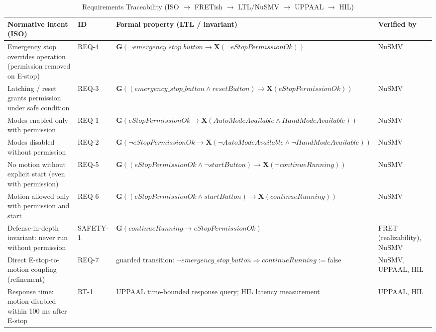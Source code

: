 \documentclass{ieeeaccess}
\theoremstyle{definition}
\newcommand{\G}{\mathbf{G}}
\newcommand{\X}{\mathbf{X}}
\begin{document}
\begin{table}[t]
\centering
\caption{Requirements Traceability (ISO $\rightarrow$ FRETish $\rightarrow$ LTL/NuSMV $\rightarrow$ UPPAAL $\rightarrow$ HIL)}
\label{tab:traceabilityMatrix}
\small
\setlength{\tabcolsep}{4pt}
\begin{tabular}{P{0.28\textwidth} P{0.08\textwidth} P{0.42\textwidth} P{0.12\textwidth}}
\toprule
\textbf{Normative intent (ISO)} & \textbf{ID} & \textbf{Formal property (LTL / invariant)} & \textbf{Verified by} \\
\midrule
Emergency stop overrides operation (permission removed on E-stop) & REQ-4 & $\G(\neg \mathit{emergency\_stop\_button} \rightarrow \X(\neg \mathit{eStopPermissionOk}))$ & NuSMV \\
Latching / reset grants permission under safe condition & REQ-3 & $\G((\mathit{emergency\_stop\_button} \land \mathit{resetButton}) \rightarrow \X(\mathit{eStopPermissionOk}))$ & NuSMV \\
Modes enabled only with permission & REQ-1 & $\G(\mathit{eStopPermissionOk} \rightarrow \X(\mathit{AutoModeAvailable} \land \mathit{HandModeAvailable}))$ & NuSMV \\
Modes disabled without permission & REQ-2 & $\G(\neg \mathit{eStopPermissionOk} \rightarrow \X(\neg \mathit{AutoModeAvailable} \land \neg \mathit{HandModeAvailable}))$ & NuSMV \\
No motion without explicit start (even with permission) & REQ-5 & $\G((\mathit{eStopPermissionOk} \land \neg \mathit{startButton}) \rightarrow \X(\neg \mathit{continueRunning}))$ & NuSMV \\
Motion allowed only with permission and start & REQ-6 & $\G((\mathit{eStopPermissionOk} \land \mathit{startButton}) \rightarrow \X(\mathit{continueRunning}))$ & NuSMV \\
Defense-in-depth invariant: never run without permission & SAFETY-1 & $\G(\mathit{continueRunning} \rightarrow \mathit{eStopPermissionOk})$ & FRET (realizability), NuSMV \\
Direct E-stop-to-motion coupling (refinement) & REQ-7 & guarded transition: $\neg \mathit{emergency\_stop\_button} \Rightarrow \mathit{continueRunning} := \mathrm{false}$ & NuSMV, UPPAAL, HIL \\
Response time: motion disabled within 100 ms after E-stop & RT-1 & UPPAAL time-bounded response query; HIL latency measurement & UPPAAL, HIL \\
\bottomrule
\end{tabular}
\end{table}
\end{document}
